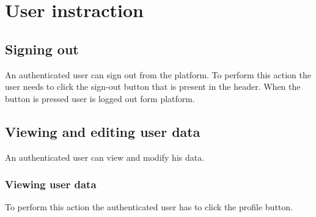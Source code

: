 \section{User instraction}
\subsection{Signing out}
An authenticated user can sign out from the platform. To perform this action the user needs to click the sign-out button that is present in the header. When the button is pressed user is logged out form platform.
\subsection{Viewing and editing user data}
An authenticated user can view and modify his data.
\subsubsection{Viewing user data}
To perform this action the authenticated user has to click the profile button.

